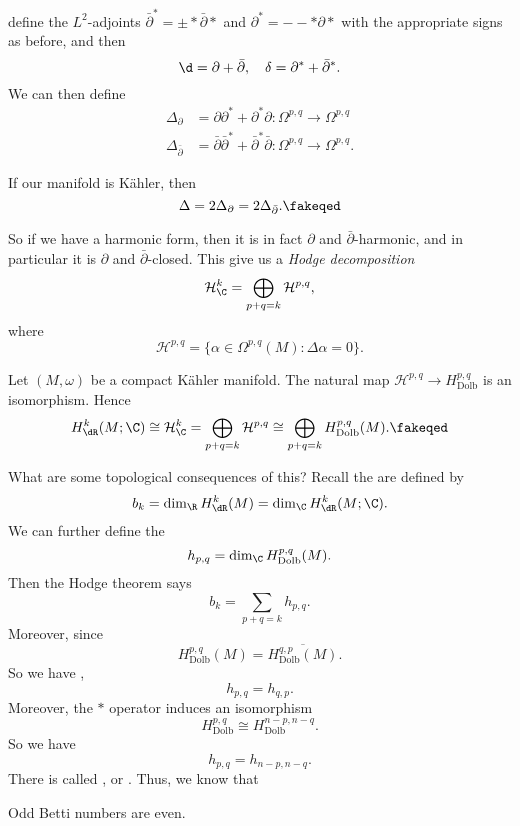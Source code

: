 \documentclass[a4paper]{article}
\newcommand\Dolb{\mathrm{Dolb}}
\begin{document}
define the $L^2$-adjoints $\bar{\partial}^* = \pm *\bar{\partial}*$ and $\partial^* = -- * \partial *$ with the appropriate signs as before, and then
\[
  \d = \partial + \bar{\partial},\quad \delta = \partial^* + \bar{\partial}^*.
\]
We can then define
\begin{align*}
  \Delta_{\partial} &= \partial \partial^* + \partial^* \partial : \Omega^{p, q} \to \Omega^{p, q}\\
  \Delta_{\bar{\partial}} &= \bar{\partial} \bar{\partial}^* + \bar{\partial}^* \bar{\partial} : \Omega^{p, q} \to \Omega^{p, q}.
\end{align*}

\begin{prop}
  If our manifold is K\"ahler, then
  \[
    \Delta = 2 \Delta_\partial = 2 \Delta_{\bar{\partial}}.\fakeqed
  \]
\end{prop}
So if we have a harmonic form, then it is in fact $\partial$ and $\bar{\partial}$-harmonic, and in particular it is $\partial$ and $\bar{\partial}$-closed. This give us a \emph{Hodge decomposition}
\[
  \mathcal{H}^k_\C = \bigoplus_{p + q = k} \mathcal{H}^{p, q},
\]
where
\[
  \mathcal{H}^{p, q} = \{\alpha \in \Omega^{p, q}(M): \Delta \alpha = 0\}.
\]
\begin{thm}
  Let $(M, \omega)$ be a compact K\"ahler manifold. The natural map $\mathcal{H}^{p, q} \to H_{\Dolb}^{p, q}$ is an isomorphism. Hence
  \[
    H^k_{\dR} (M; \C) \cong \mathcal{H}^k_{\C} = \bigoplus_{p + q = k} \mathcal{H}^{p, q} \cong \bigoplus_{p + q = k} H_{\Dolb}^{p, q}(M).\fakeqed
  \]
\end{thm}

What are some topological consequences of this? Recall the  are defined by
\[
  b_k = \dim_\R H^k_{\dR}(M) = \dim_\C H^k_{\dR}(M; \C).
\]
We can further define the 
\[
  h_{p, q} = \dim_\C H^{p, q}_{\Dolb}(M).
\]
Then the Hodge theorem says
\[
  b_k = \sum_{p + q = k} h_{p, q}.
\]
Moreover, since
\[
  H_{\Dolb}^{p, q}(M) = \overline{H_{\Dolb}^{q, p}(M)}.
\]
So we have ,
\[
  h_{p, q} = h_{q, p}.
\]
Moreover, the $*$ operator induces an isomorphism
\[
  H^{p, q}_{\Dolb} \cong H_{\Dolb}^{n - p, n - q}.
\]
So we have
\[
  h_{p, q} = h_{n - p, n - q}.
\]
There is called , or . Thus, we know that
\begin{cor}
  Odd Betti numbers are even.
\end{cor}
\end{document}
